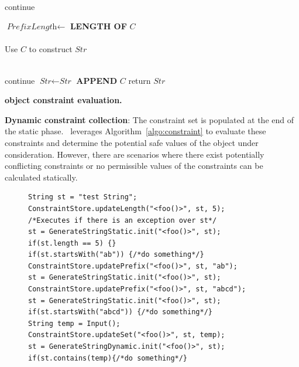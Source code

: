 \begin{mylist}
\begin{algorithm}[t]
{     {
         {\\
          \mytab continue
        }
        
        $\textit{PrefixLength} \longleftarrow$ {\bf LENGTH OF} $C$\\
        
         {\\
          \mytab  Use $C$ to construct $\textit{Str}$
        }
    }

     {
         {\\
          \mytab  continue
        }
        $\textit{Str} \leftarrow \textit{Str}$ {\bf APPEND} $C$
    }
    return $\textit{Str}$
}
\caption{\bf {} object constraint evaluation.}
\label{algo:constraint}
\end{algorithm}

 \item \textbf{Dynamic constraint collection}: The constraint set is populated
at the end of the static phase. \tool\ leverages Algorithm~\ref{algo:constraint}
to evaluate these constraints and determine the potential safe values of the
 object under consideration. However, there are scenarios where
there exist potentially conflicting constraints or no permissible values of the
constraints can be calculated statically.


\begin{figure}[!htb]
\begin{lstlisting}
String st = "test String";
ConstraintStore.updateLength("<foo()>", st, 5);
/*Executes if there is an exception over st*/
st = GenerateStringStatic.init("<foo()>", st);
if(st.length == 5) {}
if(st.startsWith("ab")) {/*do something*/}
ConstraintStore.updatePrefix("<foo()>", st, "ab");
st = GenerateStringStatic.init("<foo()>", st);
ConstraintStore.updatePrefix("<foo()>", st, "abcd");
st = GenerateStringStatic.init("<foo()>", st);
if(st.startsWith("abcd")) {/*do something*/}
String temp = Input();
ConstraintStore.updateSet("<foo()>", st, temp);
st = GenerateStringDynamic.init("<foo()>", st);
if(st.contains(temp){/*do something*/}
\end{lstlisting}
\end{figure}


\end{mylist}
